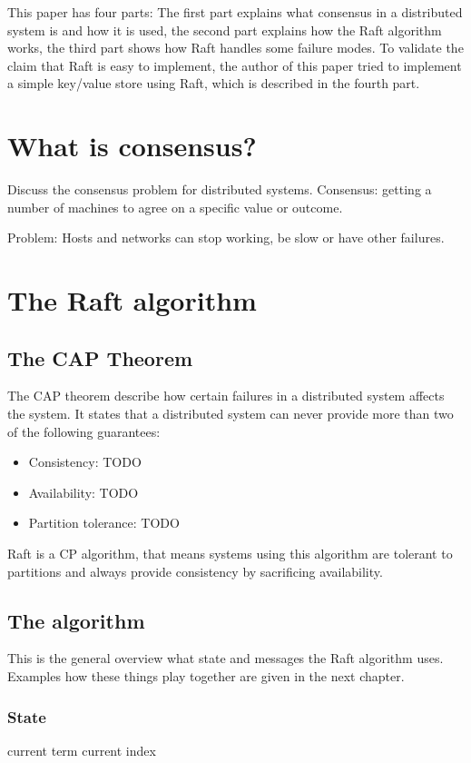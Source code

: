 This paper has four parts: The first part explains what consensus in a distributed system is and how it is used, the second part explains how the Raft algorithm works, the third part shows how Raft handles some failure modes. To validate the claim that Raft is easy to implement, the author of this paper tried to implement a simple key/value store using Raft, which is described in the fourth part.

\section{What is consensus?}

Discuss the consensus problem for distributed systems.
Consensus: getting a number of machines to agree on a specific value or outcome.

Problem: Hosts and networks can stop working, be slow or have other failures.

\section {The Raft algorithm}

\subsection{The CAP Theorem}

The CAP theorem describe how certain failures in a distributed system affects the system. It states that a distributed system can never provide more than two of the following guarantees:

\begin{itemize}
    \item Consistency: TODO
    \item Availability: TODO
    \item Partition tolerance: TODO
\end{itemize}

Raft is a CP algorithm, that means systems using this algorithm are tolerant to partitions and always provide consistency by sacrificing availability. 

\subsection{The algorithm}
This is the general overview what state and messages the Raft algorithm uses. Examples how these things play together are given in the next chapter.

\subsubsection{State}
current term
current index

